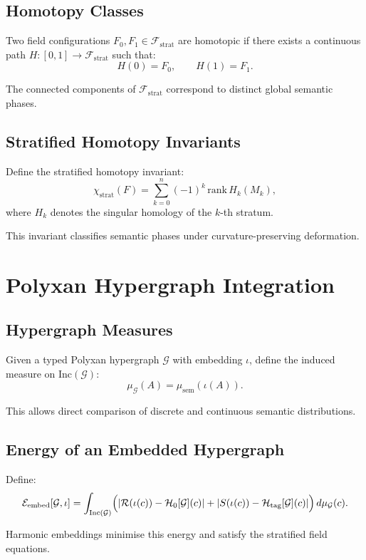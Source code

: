 \subsection{Homotopy Classes}

Two field configurations $F_0,F_1 \in \mathcal{F}_{\mathrm{strat}}$ are homotopic if there exists a continuous path $H:[0,1]\to\mathcal{F}_{\mathrm{strat}}$ such that:
\[
H(0)=F_0,
\qquad
H(1)=F_1.
\]

The connected components of $\mathcal{F}_{\mathrm{strat}}$ correspond to distinct global semantic phases.

\subsection{Stratified Homotopy Invariants}

Define the stratified homotopy invariant:
\[
\chi_{\mathrm{strat}}(F)
=
\sum_{k=0}^n (-1)^k\, \mathrm{rank}\, H_k(M_k),
\]
where $H_k$ denotes the singular homology of the $k$-th stratum.

This invariant classifies semantic phases under curvature-preserving deformation.

\section{Polyxan Hypergraph Integration}

\subsection{Hypergraph Measures}

Given a typed Polyxan hypergraph $\mathcal{G}$ with embedding $\iota$, define the induced measure on $\mathrm{Inc}(\mathcal{G})$:
\[
\mu_{\mathcal{G}}(A)
=
\mu_{\mathrm{sem}}(\iota(A)).
\]

This allows direct comparison of discrete and continuous semantic distributions.

\subsection{Energy of an Embedded Hypergraph}

Define:
\[
\mathcal{E}_{\mathrm{embed}}[\mathcal{G},\iota]
=
\int_{\mathrm{Inc}(\mathcal{G})}
\Bigl(
|\mathcal{R}(\iota(c)) - \mathcal{H}_0[\mathcal{G}](c)|
+
|S(\iota(c)) - \mathcal{H}_{\mathrm{tag}}[\mathcal{G}](c)|
\Bigr)\, d\mu_{\mathcal{G}}(c).
\]

Harmonic embeddings minimise this energy and satisfy the stratified field equations.

